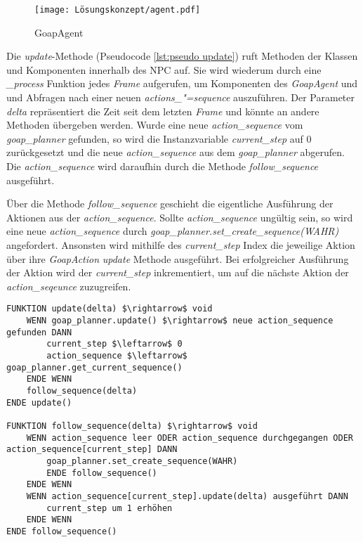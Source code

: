 \begin{figure}[h]
  \centering
  \texttt{[image: Lösungskonzept/agent.pdf]}
	\captionsetup{justification=justified, format=plain}
  \caption{GoapAgent}
  \label{fig:GoapAgent}
\end{figure}

Die \textit{update}-Methode (Pseudocode \ref{lst:pseudo update}) ruft Methoden der Klassen und Komponenten innerhalb des NPC auf. Sie wird wiederum durch eine \textit{\_process} Funktion jedes \textit{Frame} aufgerufen, um Komponenten des \textit{GoapAgent} und und Abfragen nach einer neuen \textit{actions\_"=sequence} auszuführen. Der Parameter \textit{delta} repräsentiert die Zeit seit dem letzten \textit{Frame} und könnte an andere Methoden übergeben werden. Wurde eine neue \textit{action\_sequence} vom \textit{goap\_planner} gefunden, so wird die Instanzvariable \textit{current\_step} auf $0$ zurückgesetzt und die neue \textit{action\_sequence} aus dem \textit{goap\_planner} abgerufen. Die \textit{action\_sequence} wird daraufhin durch die Methode \textit{follow\_sequence} ausgeführt.

\"{U}ber die Methode \textit{follow\_sequence} geschieht die eigentliche Ausführung der Aktionen aus der \textit{action\_sequence}. Sollte \textit{action\_sequence} ungültig sein, so wird eine neue \textit{action\_sequence} durch \textit{goap\_planner.set\_create\_sequence(WAHR)} angefordert. Ansonsten wird mithilfe des \textit{current\_step} Index die jeweilige Aktion über ihre \textit{GoapAction} \textit{update} Methode ausgeführt. Bei erfolgreicher Ausführung der Aktion wird der \textit{current\_step} inkrementiert, um auf die nächste Aktion der \textit{action\_seqeunce} zuzugreifen.


\begin{lstlisting}[language=Pseudo, caption={update und follow\_sequence Methode des GoapAgent}, mathescape=true, label={lst:pseudo update}]
FUNKTION update(delta) $\rightarrow$ void
    WENN goap_planner.update() $\rightarrow$ neue action_sequence gefunden DANN
        current_step $\leftarrow$ 0
        action_sequence $\leftarrow$ goap_planner.get_current_sequence()
    ENDE WENN
    follow_sequence(delta)
ENDE update()

FUNKTION follow_sequence(delta) $\rightarrow$ void
	WENN action_sequence leer ODER action_sequence durchgegangen ODER action_sequence[current_step] DANN
		goap_planner.set_create_sequence(WAHR)
		ENDE follow_sequence()
	ENDE WENN
	WENN action_sequence[current_step].update(delta) ausgeführt DANN
		current_step um 1 erhöhen
	ENDE WENN
ENDE follow_sequence()
\end{lstlisting}














